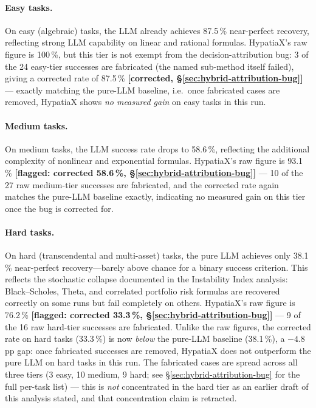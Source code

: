 \documentclass[twoside,11pt]{article}
\begin{document}
\paragraph{Easy tasks.}
On easy (algebraic) tasks, the LLM already achieves 87.5\,\% near-perfect recovery,
reflecting strong LLM capability on linear and rational formulas.  HypatiaX's
raw figure is 100\,\%, but this tier is not exempt from the decision-attribution
bug: 3 of the 24 easy-tier successes are fabricated (the named sub-method
itself failed), giving a corrected rate of 87.5\,\%
\textbf{[corrected, \S\ref{sec:hybrid-attribution-bug}]} --- exactly matching
the pure-LLM baseline, i.e.\ once fabricated cases are removed, HypatiaX shows
\emph{no measured gain} on easy tasks in this run.

\paragraph{Medium tasks.}
On medium tasks, the LLM success rate drops to 58.6\,\%, reflecting the additional
complexity of nonlinear and exponential formulas.  HypatiaX's raw figure is 93.1\,\%
\textbf{[flagged: corrected 58.6\,\%, \S\ref{sec:hybrid-attribution-bug}]}
--- 10 of the 27 raw medium-tier successes are fabricated, and the corrected
rate again matches the pure-LLM baseline exactly, indicating no measured gain
on this tier once the bug is corrected for.

\paragraph{Hard tasks.}
On hard (transcendental and multi-asset) tasks, the pure LLM achieves only 38.1\,\%
near-perfect recovery---barely above chance for a binary success criterion.  This
reflects the stochastic collapse documented in the Instability Index analysis:
Black--Scholes, Theta, and correlated portfolio risk formulas are recovered correctly
on some runs but fail completely on others.  HypatiaX's raw figure is 76.2\,\%
\textbf{[flagged: corrected 33.3\,\%, \S\ref{sec:hybrid-attribution-bug}]} ---
9 of the 16 raw hard-tier successes are fabricated. Unlike the raw figures,
the corrected rate on hard tasks (33.3\,\%) is now \emph{below} the pure-LLM
baseline (38.1\,\%), a $-4.8$\,pp gap: once fabricated successes are removed,
HypatiaX does not outperform the pure LLM on hard tasks in this run.
The fabricated cases are spread across all three tiers (3 easy, 10 medium, 9
hard; see \S\ref{sec:hybrid-attribution-bug} for the full per-task list) ---
this is \emph{not} concentrated in the hard tier as an earlier draft of this
analysis stated, and that concentration claim is retracted.
\end{document}
